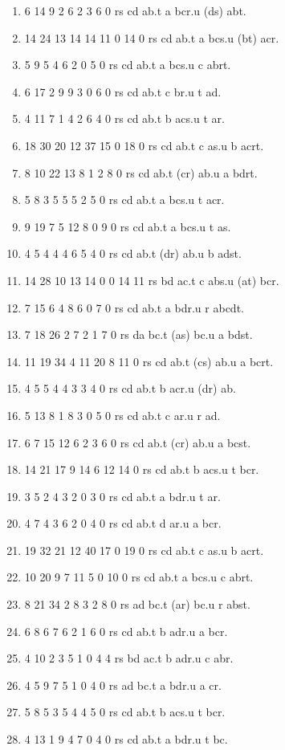 \documentclass[10pt,journal]{IEEEtran}
\begin{document}
\begin{enumerate}
\item 6 14 9 2 6 2 3 6 0 rs cd ab.t a bcr.u (ds) abt.
\item 14 24 13 14 14 11 0 14 0 rs cd ab.t a bcs.u (bt) acr.
\item 5 9 5 4 6 2 0 5 0 rs cd ab.t a bcs.u c abrt.
\item 6 17 2 9 9 3 0 6 0 rs cd ab.t c br.u t ad.
\item 4 11 7 1 4 2 6 4 0 rs cd ab.t b acs.u t ar.
\item 18 30 20 12 37 15 0 18 0 rs cd ab.t c as.u b acrt.
\item 8 10 22 13 8 1 2 8 0 rs cd ab.t (cr) ab.u a bdrt.
\item 5 8 3 5 5 5 2 5 0 rs cd ab.t a bcs.u t acr.
\item 9 19 7 5 12 8 0 9 0 rs cd ab.t a bcs.u t as.
\item 4 5 4 4 4 6 5 4 0 rs cd ab.t (dr) ab.u b adst.
\item 14 28 10 13 14 0 0 14 11 rs bd ac.t c abs.u (at) bcr.
\item 7 15 6 4 8 6 0 7 0 rs cd ab.t a bdr.u r abcdt.
\item 7 18 26 2 7 2 1 7 0 rs da bc.t (as) bc.u a bdst.
\item 11 19 34 4 11 20 8 11 0 rs cd ab.t (cs) ab.u a bcrt.
\item 4 5 5 4 4 3 3 4 0 rs cd ab.t b acr.u (dr) ab.
\item 5 13 8 1 8 3 0 5 0 rs cd ab.t c ar.u r ad.
\item 6 7 15 12 6 2 3 6 0 rs cd ab.t (cr) ab.u a bcst.
\item 14 21 17 9 14 6 12 14 0 rs cd ab.t b acs.u t bcr.
\item 3 5 2 4 3 2 0 3 0 rs cd ab.t a bdr.u t ar.
\item 4 7 4 3 6 2 0 4 0 rs cd ab.t d ar.u a bcr.
\item 19 32 21 12 40 17 0 19 0 rs cd ab.t c as.u b acrt.
\item 10 20 9 7 11 5 0 10 0 rs cd ab.t a bcs.u c abrt.
\item 8 21 34 2 8 3 2 8 0 rs ad bc.t (ar) bc.u r abst.
\item 6 8 6 7 6 2 1 6 0 rs cd ab.t b adr.u a bcr.
\item 4 10 2 3 5 1 0 4 4 rs bd ac.t b adr.u c abr.
\item 4 5 9 7 5 1 0 4 0 rs ad bc.t a bdr.u a cr.
\item 5 8 5 3 5 4 4 5 0 rs cd ab.t b acs.u t bcr.
\item 4 13 1 9 4 7 0 4 0 rs cd ab.t a bdr.u t bc.

\end{enumerate}
\end{document}
